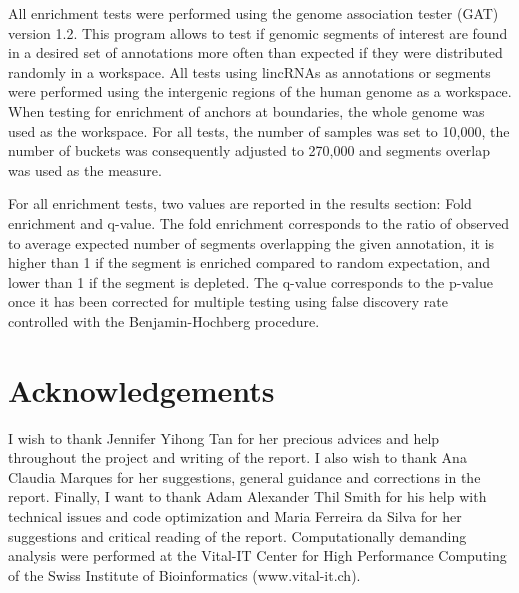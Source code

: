 \documentclass[11pt,a4paper]{report}
\begin{document}
All enrichment tests were performed using the genome association tester (GAT) \cite{Heger2013}⁠ version 1.2. This program allows to test if genomic segments of interest are found in a desired set of annotations more often than expected if they were distributed randomly in a workspace. All tests using lincRNAs as annotations or segments were performed using the intergenic regions of the human genome as a workspace. When testing for enrichment of anchors at boundaries, the whole genome was used as the workspace. For all tests, the number of samples was set to 10,000, the number of buckets was consequently adjusted to 270,000 and segments overlap was used as the measure.

For all enrichment tests, two values are reported in the results section: Fold enrichment and q-value. The fold enrichment corresponds to the ratio of observed to average expected number of segments overlapping the given annotation, it is higher than 1 if the segment is enriched compared to random expectation, and lower than 1 if the segment is depleted. The q-value corresponds to the p-value once it has been corrected for multiple testing using false discovery rate controlled with the Benjamin-Hochberg procedure.

\section*{Acknowledgements}
I wish to thank Jennifer Yihong Tan for her precious advices and help throughout the project and writing of the report. I also wish to thank Ana Claudia Marques for her suggestions, general guidance and corrections in the report. Finally, I want to thank Adam Alexander Thil Smith for  his help with technical issues and code optimization and Maria Ferreira da Silva for her suggestions and critical reading of the report.
Computationally demanding analysis were performed at the Vital-IT Center for High Performance Computing of the Swiss Institute of Bioinformatics (www.vital-it.ch).


\fancyhead[L]{\slshape }

\end{document}

